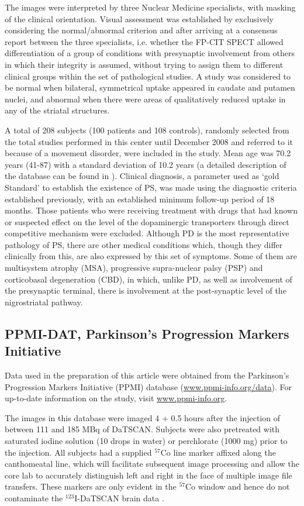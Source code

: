 The images were interpreted by three Nuclear Medicine specialists, with masking of the clinical orientation. Visual assessment was established by exclusively considering the normal/abnormal criterion and after arriving at a consensus report between the three specialists, i.e. whether the FP-CIT SPECT allowed differentiation of a group of conditions with presynaptic involvement from others in which their integrity is assumed, without trying to assign them to different clinical groups within the set of pathological studies. A study was considered to be normal when bilateral, symmetrical uptake appeared in caudate and putamen nuclei, and abnormal when there were areas of qualitatively reduced uptake in any of the striatal structures. 

A total of 208 subjects (100 patients and 108 controls), randomly selected from the total studies performed in this center until December 2008 and referred to it because of a movement disorder, were included in the study. Mean age was 70.2 years (41-87) with a standard deviation of 10.2 years (a detailed description of the database can be found in \cite{Lozano2007}). Clinical diagnosis, a parameter used as `gold Standard' to establish the existence of PS, was made using the diagnostic criteria established previously, with an established minimum follow-up period of 18 months. Those patients who were receiving treatment with drugs that had known or suspected effect on the level of the dopaminergic transporters through direct competitive mechanism were excluded. Although PD is the most representative pathology of PS, there are other medical conditions which, though they differ clinically from this, are also expressed by this set of symptoms. Some of them are multisystem atrophy (MSA), progressive supra-nuclear palsy (PSP) and corticobasal degeneration (CBD), in which, unlike PD, as well as involvement of the presynaptic terminal, there is involvement at the post-synaptic level of the nigrostriatal pathway. 

\subsection{PPMI-DAT, Parkinson's Progression Markers Initiative}\label{sec:ppmi}
Data used in the preparation of this article were obtained from the Parkinson's Progression Markers Initiative (PPMI) database (\url{www.ppmi-info.org/data}). For up-to-date information on the study, visit \url{www.ppmi-info.org}.

The images in this database were imaged 4 + 0.5 hours after the injection of between 111 and 185 MBq of DaTSCAN. Subjects were also pretreated with saturated iodine solution (10 drops in water) or perchlorate (1000 mg) prior to the injection. All subjects had a supplied $^{57}$Co line marker affixed along the canthomeatal line, which will facilitate subsequent image processing and allow the core lab to accurately distinguish left and right in the face of multiple image file transfers. These markers are only evident in the $^{57}$Co window and hence do not contaminate the $^{123}$I-DaTSCAN brain data \cite{PPMI,Inititative2010}. 


